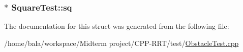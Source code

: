 \subsubsection[{\texorpdfstring{sq}{sq}}]{$\ast$ Square\+Test\+::sq}\hypertarget{structSquareTest_a593accc2090fe5d6a462c416e712ff5a}{}\label{structSquareTest_a593accc2090fe5d6a462c416e712ff5a}


The documentation for this struct was generated from the following file\+:\begin{DoxyCompactItemize}
\item 
/home/bala/workspace/\+Midterm project/\+C\+P\+P-\/\+R\+R\+T/test/\hyperlink{ObstacleTest_8cpp}{Obstacle\+Test.\+cpp}\end{DoxyCompactItemize}
